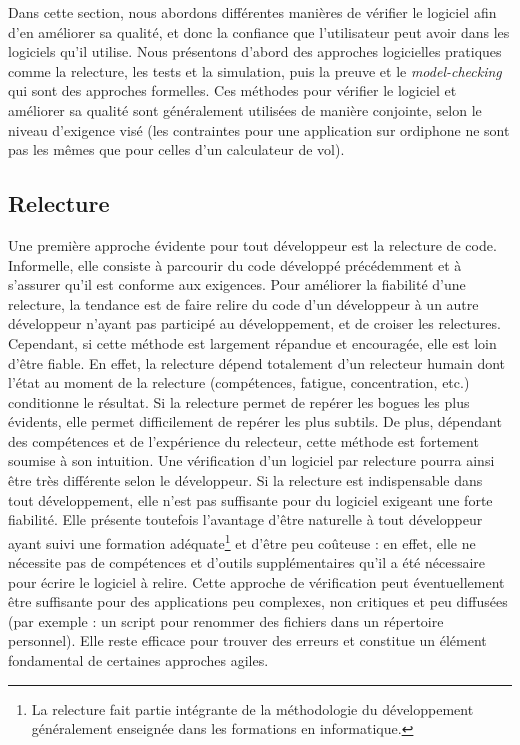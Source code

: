 Dans cette section, nous abordons différentes manières de vérifier le logiciel
afin d'en améliorer sa qualité, et donc la confiance que l'utilisateur peut
avoir dans les logiciels qu'il utilise. Nous présentons d'abord des approches
logicielles pratiques comme la relecture, les tests et la simulation, puis la
preuve et le \emph{model-checking} qui sont des approches formelles.
Ces méthodes pour vérifier le logiciel et améliorer sa qualité sont
généralement utilisées de manière conjointe, selon le niveau d'exigence visé
(les contraintes pour une application sur ordiphone ne sont pas les mêmes que
pour celles d'un calculateur de vol).

\subsection{Relecture}
\label{ch:verification:subsec:relecture}

Une première approche évidente pour tout développeur est la relecture de code.
Informelle, elle consiste à parcourir du code développé précédemment et à
s'assurer qu'il est conforme aux exigences. Pour améliorer la fiabilité d'une
relecture, la tendance est de faire relire du code d'un développeur à un autre
développeur n'ayant pas participé au développement, et de croiser les
relectures. Cependant, si cette méthode est largement répandue et encouragée,
elle est loin d'être fiable. En effet, la relecture dépend totalement d'un
relecteur humain dont l'état au moment de la relecture (compétences, fatigue,
concentration, etc.) conditionne le résultat. Si la relecture permet de repérer
les bogues les plus évidents, elle permet difficilement de repérer les plus
subtils. De plus, dépendant des compétences et de l'expérience du relecteur,
cette méthode est fortement soumise à son intuition. Une vérification d'un
logiciel par relecture pourra ainsi être très différente selon le développeur.
Si la relecture est indispensable dans tout développement, elle n'est pas
suffisante pour du logiciel exigeant une forte fiabilité. Elle présente
toutefois l'avantage d'être naturelle à tout développeur ayant suivi une
formation adéquate\footnote{La relecture fait partie intégrante de la
méthodologie du développement généralement enseignée dans les formations en
informatique.} et d'être peu coûteuse : en effet, elle ne nécessite pas de
compétences et d'outils supplémentaires qu'il a été nécessaire pour écrire le
logiciel à relire. Cette approche de vérification peut éventuellement être
suffisante pour des applications peu complexes, non critiques et peu diffusées
(par exemple : un script pour renommer des fichiers dans un répertoire
personnel). Elle reste efficace pour trouver des erreurs et constitue un
élément fondamental de certaines approches agiles.


